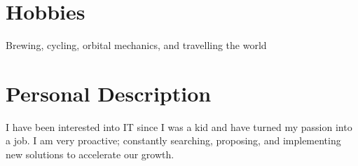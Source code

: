 \documentclass[]{template/friggeri-cv} %
\begin{document}

\section{Hobbies}

{Brewing, cycling, orbital mechanics, and travelling the world}

\section{Personal Description}
        {
          I have been interested into IT since I was a kid and have turned my passion into a job.
          I am very proactive; constantly searching, proposing, and implementing new solutions to accelerate our growth.
        }
\end{document}
